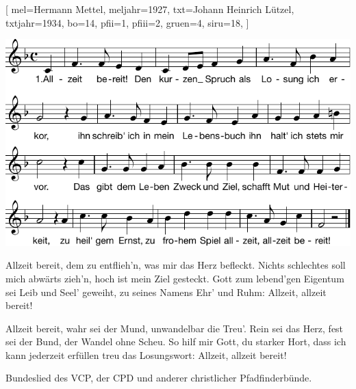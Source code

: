 [
    mel={Hermann Mettel}, 
    meljahr={1927},
    txt={Johann Heinrich Lützel}, 
    txtjahr={1934},
    bo={14}, 
    pfii={1}, 
    pfiii={2}, 
    gruen={4}, 
    siru={18},
]

\beginverse 
\endverse  
\includegraphics[draft=false, width=1\textwidth]{Noten/Lied003.pdf}	

\beginverse
Allzeit bereit, dem zu entflieh'n, was mir das Herz befleckt.
Nichts schlechtes soll mich abwärts zieh'n, hoch ist mein Ziel gesteckt.
Gott zum lebend'gen Eigentum sei Leib und Seel' geweiht,
zu seines Namens Ehr' und Ruhm: Allzeit, allzeit bereit!
\endverse

\beginverse
Allzeit bereit, wahr sei der Mund, unwandelbar die Treu'.
Rein sei das Herz, fest sei der Bund, der Wandel ohne Scheu.
So hilf mir Gott, du starker Hort, dass ich kann jederzeit
erfüllen treu das Losungswort: Allzeit, allzeit bereit!
\endverse

\endsong

\beginscripture{}
Bundeslied des VCP, der CPD und anderer christlicher Pfadfinderbünde.
\endscripture

